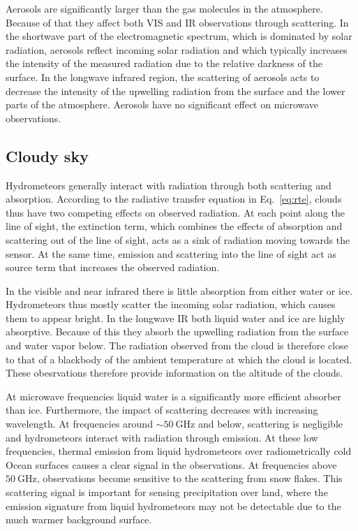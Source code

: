 Aerosols are significantly larger than the gas molecules in the atmosphere.
Because of that they affect both VIS and IR observations through scattering. In
the shortwave part of the electromagnetic spectrum, which is dominated by solar
radiation, aerosols reflect incoming solar radiation and which typically
increases the intensity of the measured radiation due to the relative darkness
of the surface. In the longwave infrared region, the scattering of aerosols acts
to decrease the intensity of the upwelling radiation from the surface and the
lower parts of the atmosphere. Aerosols have no significant effect on microwave
observations.

\subsection{Cloudy sky}

Hydrometeors generally interact with radiation through both scattering and
absorption. According to the radiative transfer equation in Eq.~\ref{eq:rte},
clouds thus have two competing effects on observed radiation. At each point
along the line of sight, the extinction term, which combines the effects of
absorption and scattering out of the line of sight, acts as a sink of radiation
moving towards the sensor. At the same time, emission and scattering into the
line of sight act as source term that increases the observed radiation.

In the visible and near infrared there is little absorption from either water
or ice. Hydrometeors thus mostly scatter the incoming solar radiation, which
causes them to appear bright. In the longwave IR both liquid water and ice
are highly absorptive. Because of this they absorb the upwelling radiation from
the surface and water vapor below. The radiation observed from the cloud
is therefore close to that of a blackbody of the ambient temperature at which the cloud
is located. These obesrvations therefore provide information on the altitude
of the clouds.

At microwave frequencies liquid water is a significantly more efficient absorber
than ice. Furthermore, the impact of scattering decreases with increasing
wavelength. At frequencies around $\sim \SI{50}{\giga \hertz}$ and below,
scattering is negligible and hydrometeors interact with radiation through
emission. At these low frequencies, thermal emission from liquid hydrometeors
over radiometrically cold Ocean surfaces causes a clear signal in the
observations. At frequencies above $\SI{50}{\giga \hertz}$, observations become
sensitive to the scattering from snow flakes. This scattering signal is
important for sensing precipitation over land, where the emission signature from
liquid hydrometeors may not be detectable due to the much warmer background
surface.


